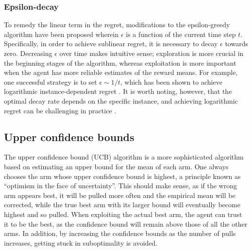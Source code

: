 \subsubsection{Epsilon-decay}
To remedy the linear term in the regret, modifications to the epsilon-greedy algorithm have been proposed wherein $\epsilon$ is a function of the current time step $t$.
Specifically, in order to achieve sublinear regret, it is necessary to decay $\epsilon$ towards zero.
Decreasing $\epsilon$ over time makes intuitive sense; exploration is more crucial in the beginning stages of the algorithm, whereas exploitation is more important when the agent has more reliable estimates of the reward means.
For example, one successful strategy is to set $\epsilon \sim 1/t$, which has been shown to achieve logarithmic instance-dependent regret \autocite{auer2002}.
It is worth noting, however, that the optimal decay rate depends on the specific instance, and achieving logarithmic regret can be challenging in practice \autocite{bubeck2012}.


\subsection{Upper confidence bounds}
The upper confidence bound (UCB) algorithm is a more sophisticated algorithm based on estimating an upper bound for the mean of each arm.
One always chooses the arm whose upper confidence bound is highest, a principle known as \enquote{optimism in the face of uncertainty}.
This should make sense, as if the wrong arm appears best, it will be pulled more often and the empirical mean will be corrected, while the true best arm with its larger bound will eventually become highest and so pulled.
When exploiting the actual best arm, the agent can trust it to be the best, as the confidence bound will remain above those of all the other arms.
In addition, by increasing the confidence bounds as the number of pulls increases, getting stuck in suboptimality is avoided.

